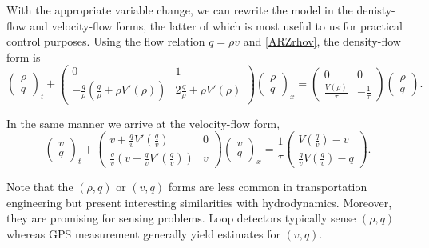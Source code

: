 \documentclass[preprint]{elsarticle}
\begin{document}
With the appropriate variable change, we can rewrite the model in the denisty-flow and velocity-flow forms, the latter of which is most useful to us for practical control purposes. Using the flow relation $q = \rho v$ and \eqref{ARZrhov}, the density-flow form is
\begin{equation} \label{ARZrhoq}
\begin{pmatrix}
\rho \\ q
\end{pmatrix}_t
+ \begin{pmatrix}
0 & 1 \\
-\frac{q}{\rho} \left(\frac{q}{\rho} + \rho V'(\rho) \right) & 2\frac{q}{\rho} + \rho V'(\rho) 
\end{pmatrix}
\begin{pmatrix}
\rho \\ q
\end{pmatrix}_x = 
\begin{pmatrix}
0 & 0 \\ 
\frac{V(\rho)}{\tau} & -\frac{1}{\tau}
\end{pmatrix} 
\begin{pmatrix}
\rho \\ q
\end{pmatrix}.
\end{equation}

In the same manner we arrive at the velocity-flow form,
\begin{equation} \label{ARZvq}
\begin{pmatrix}
v \\ q
\end{pmatrix}_t
+ \begin{pmatrix}
v + \frac{q}{v} V'\left(\frac{q}{v}\right) & 0 \\
\frac{q}{v} \left( v + \frac{q}{v} V'\left(\frac{q}{v}\right)\right) & v
\end{pmatrix}
\begin{pmatrix}
v \\ q
\end{pmatrix}_x = 
\dfrac{1}{\tau}
\begin{pmatrix}
V\left( \frac{q}{v}\right) - v \\
\frac{q}{v}V\left( \frac{q}{v}\right) - q
\end{pmatrix}.
\end{equation}

Note that the $\left(\rho, q\right)$ or $\left(v, q\right)$ forms are less common in transportation engineering but present interesting similarities with hydrodynamics. Moreover, they are promising for sensing problems. Loop detectors typically sense $\left(\rho, q\right)$ whereas GPS measurement generally yield estimates for $\left(v, q\right)$.
\end{document}
